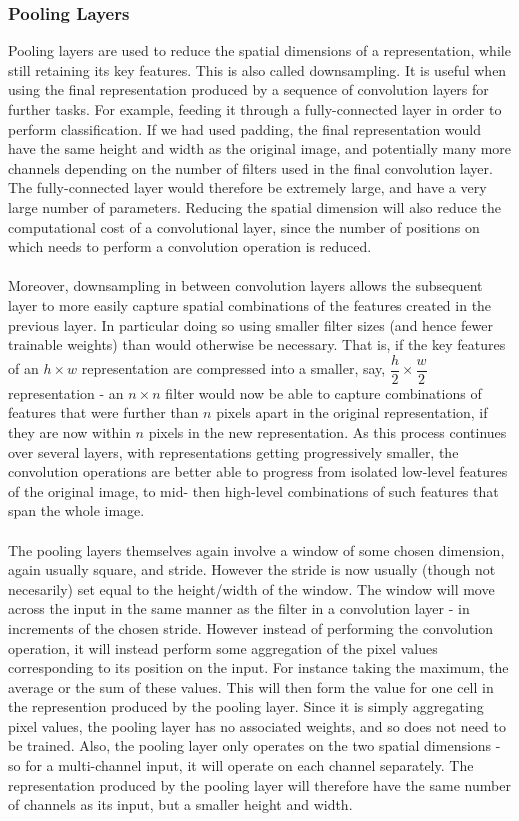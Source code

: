 \documentclass[11pt]{article} %
\theoremstyle{plain}
\theoremstyle{definition}
\begin{document}
\subsubsection{Pooling Layers}
Pooling layers are used to reduce the spatial dimensions of a representation, while still retaining its key features. This is also called downsampling. It is useful when using the final representation produced by a sequence of convolution layers for further tasks. For example, feeding it through a fully-connected layer in order to perform classification. If we had used padding, the final representation would have the same height and width as the original image, and potentially many more channels depending on the number of filters used in the final convolution layer. The fully-connected layer would therefore be extremely large, and have a very large number of parameters. Reducing the spatial dimension will also reduce the computational cost of a convolutional layer, since the number of positions on which needs to perform a convolution operation is reduced.
\\
\\
\noindent
Moreover, downsampling in between convolution layers allows the subsequent layer to more easily capture spatial combinations of the features created in the previous layer. In particular doing so using smaller filter sizes (and hence fewer trainable weights) than would otherwise be necessary. That is, if the key features of an \(h \times w\) representation are compressed into a smaller, say, \(\dfrac{h}{2} \times \dfrac{w}{2}\) representation - an \(n \times n\) filter would now be able to capture combinations of features that were further than \(n\) pixels apart in the original representation, if they are now within \(n\) pixels in the new representation. As this process continues over several layers, with representations getting progressively smaller, the convolution operations are better able to progress from isolated low-level features of the original image, to mid- then high-level combinations of such features that span the whole image.
\\
\\
\noindent
The pooling layers themselves again involve a window of some chosen dimension, again usually square, and stride. However the stride is now usually (though not necesarily) set equal to the height/width of the window. The window will move across the input in the same manner as the filter in a convolution layer - in increments of the chosen stride. However instead of performing the convolution operation, it will instead perform some aggregation of the pixel values corresponding to its position on the input. For instance taking the maximum, the average or the sum of these values. This will then form the value for one cell in the represention produced by the pooling layer. Since it is simply aggregating pixel values, the pooling layer has no associated weights, and so does not need to be trained. Also, the pooling layer only operates on the two spatial dimensions - so for a multi-channel input, it will operate on each channel separately. The representation produced by the pooling layer will therefore have the same number of channels as its input, but a smaller height and width.
\end{document}
